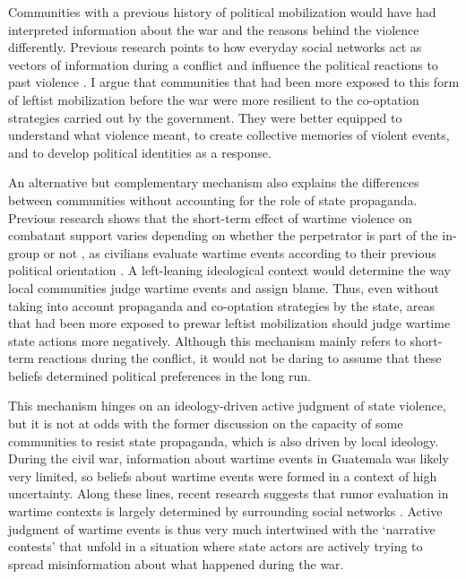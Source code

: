 \documentclass[12pt, notitlepage]{article}
\begin{document}
Communities with a previous history of political mobilization would have had interpreted information about the war and the reasons behind the violence differently.
Previous research points to how everyday social networks act as vectors of information during a conflict \citep{Shesterinina:2016aa} and influence the political reactions to past violence \citep{Rydgren:2007aa, Dorff:2017aa}.
I argue that communities that had been more exposed to this form of leftist mobilization before the war were more resilient to the co-optation strategies carried out by the government.
They were better equipped to understand what violence meant, to create collective memories of violent events, and to develop political identities as a response.

An alternative but complementary mechanism also explains the differences between communities without accounting for the role of state propaganda.
Previous research shows that the short-term effect of wartime violence on combatant support varies depending on whether the perpetrator is part of the in-group or not \citep{Lyall:2013aa}, as civilians evaluate wartime events according to their previous political orientation \citep{Silverman:2019aa, Pechenkina:2020ul}.
A left-leaning ideological context would determine the way local communities judge wartime events and assign blame.
Thus, even without taking into account propaganda and co-optation strategies by the state, areas that had been more exposed to prewar leftist mobilization should judge wartime state actions more negatively.
Although this mechanism mainly refers to short-term reactions during the conflict, it would not be daring to assume that these beliefs determined political preferences in the long run.

This mechanism hinges on an ideology-driven active judgment of state violence, but it is not at odds with the former discussion on the capacity of some communities to resist state propaganda, which is also driven by local ideology.
During the civil war, information about wartime events in Guatemala was likely very limited, so beliefs about wartime events were formed in a context of high uncertainty.
Along these lines, recent research suggests that rumor evaluation in wartime contexts is largely determined by surrounding social networks \citep{Schon:2021wf}.
Active judgment of wartime events is thus very much intertwined with the `narrative contests' that unfold in a situation where state actors are actively trying to spread misinformation about what happened during the war.
\end{document}
